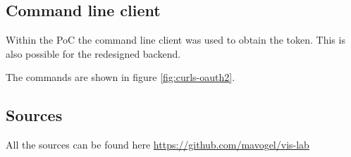 \documentclass[11pt]{article}
\begin{document}
	\subsection{Command line client}
	Within the PoC the command line client was used to obtain the token. This is also possible for the redesigned backend. 
	
	The commands are shown in figure \ref{fig:curls-oauth2}.
	
	\subsection{Sources}
	All the sources can be found here \url{https://github.com/mavogel/vis-lab}
	
\end{document}
